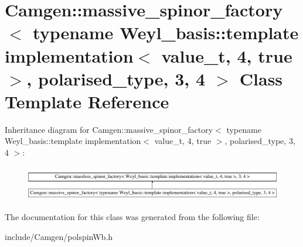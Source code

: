 \hypertarget{a00354}{}\section{Camgen\+:\+:massive\+\_\+spinor\+\_\+factory$<$ typename Weyl\+\_\+basis\+:\+:template implementation$<$ value\+\_\+t, 4, true $>$, polarised\+\_\+type, 3, 4 $>$ Class Template Reference}
\label{a00354}
Inheritance diagram for Camgen\+:\+:massive\+\_\+spinor\+\_\+factory$<$ typename Weyl\+\_\+basis\+:\+:template implementation$<$ value\+\_\+t, 4, true $>$, polarised\+\_\+type, 3, 4 $>$\+:\begin{figure}[H]
\begin{center}
\leavevmode
\includegraphics[height=1.538461cm]{a00354}
\end{center}
\end{figure}


The documentation for this class was generated from the following file\+:\begin{DoxyCompactItemize}
\item 
include/\+Camgen/polspin\+Wb.\+h\end{DoxyCompactItemize}
